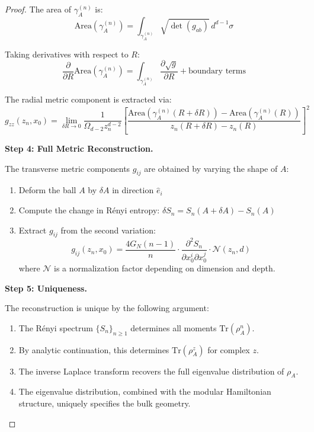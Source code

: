 \documentclass[12pt,a4paper]{article}
\begin{document}
\begin{proof}
The area of $\gamma_A^{(n)}$ is:
\begin{equation}
\text{Area}(\gamma_A^{(n)}) = \int_{\gamma_A^{(n)}} \sqrt{\det(g_{ab})} \, d^{d-1}\sigma
\end{equation}

Taking derivatives with respect to $R$:
\begin{equation}
\frac{\partial}{\partial R}\text{Area}(\gamma_A^{(n)}) = \int_{\gamma_A^{(n)}} \frac{\partial \sqrt{g}}{\partial R} + \text{boundary terms}
\end{equation}

The radial metric component is extracted via:
\begin{equation}
g_{zz}(z_n, x_0) = \lim_{\delta R \to 0} \frac{1}{\Omega_{d-2}z_n^{d-2}} \left[ \frac{\text{Area}(\gamma_A^{(n)}(R+\delta R)) - \text{Area}(\gamma_A^{(n)}(R))}{z_n(R+\delta R) - z_n(R)} \right]^2
\end{equation}

\textbf{Step 4: Full Metric Reconstruction.}

The transverse metric components $g_{ij}$ are obtained by varying the shape of $A$:
\begin{enumerate}
    \item Deform the ball $A$ by $\delta A$ in direction $\hat{e}_i$
    \item Compute the change in R\'enyi entropy: $\delta S_n = S_n(A + \delta A) - S_n(A)$
    \item Extract $g_{ij}$ from the second variation:
    \begin{equation}
    g_{ij}(z_n, x_0) = \frac{4G_N(n-1)}{n} \cdot \frac{\partial^2 S_n}{\partial x_0^i \partial x_0^j} \cdot \mathcal{N}(z_n, d)
    \end{equation}
    where $\mathcal{N}$ is a normalization factor depending on dimension and depth.
\end{enumerate}

\textbf{Step 5: Uniqueness.}

The reconstruction is unique by the following argument:
\begin{enumerate}
    \item The R\'enyi spectrum $\{S_n\}_{n \geq 1}$ determines all moments $\text{Tr}(\rho_A^n)$.
    \item By analytic continuation, this determines $\text{Tr}(\rho_A^z)$ for complex $z$.
    \item The inverse Laplace transform recovers the full eigenvalue distribution of $\rho_A$.
    \item The eigenvalue distribution, combined with the modular Hamiltonian structure, uniquely specifies the bulk geometry.
\end{enumerate}


\end{proof}
\end{document}
